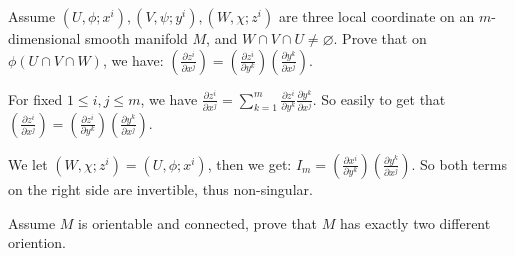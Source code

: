 \documentclass{ctexart}
\begin{document}
\begin{problem}\label{pro:1.2}
  Assume \((U,\phi;x^i),(V,\psi;y^i),(W,\chi;z^i)\) are three local coordinate on an \(m\)-dimensional smooth manifold \(M\), and \(W \cap V \cap U \neq \varnothing\).
  Prove that on \(\phi(U \cap V \cap W)\), we have:
  \(\left( \frac{\partial z^i}{\partial x^j}\right)=\left(\frac{\partial z^i}{\partial y^k}\right)\left(\frac{\partial y^k}{\partial x^j}\right)\).
\end{problem}
\begin{solution}
  For fixed \(1 \leq i,j \leq m\), we have \(\frac{\partial z^i}{\partial x^j}=\sum_{k=1}^{m} \frac{\partial z^i}{\partial y^k} \frac{\partial y^k}{\partial x^j}\).
  So easily to get that \(\left( \frac{\partial z^i}{\partial x^j}\right)=\left(\frac{\partial z^i}{\partial y^k}\right)\left(\frac{\partial y^k}{\partial x^j}\right)\).

  We let \((W,\chi;z^i)=(U,\phi;x^i)\), then we get:
  \(I_m=\left(\frac{\partial x^i}{\partial y^k}\right)\left(\frac{\partial y^k}{\partial x^j}\right)\).
  So both terms on the right side are invertible, thus non-singular.
\end{solution}
\begin{problem}\label{pro:1.3}
  Assume \(M\) is orientable and connected, prove that \(M\) has exactly two different oriention.
\end{problem}
\end{document}
